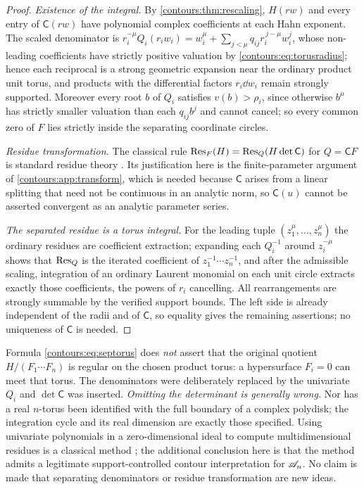 \documentclass[11pt,letterpaper]{article}
\theoremstyle{definition}
\theoremstyle{remark}
\numberwithin{equation}{section}
\begin{document}
\begin{proof}
\emph{Existence of the integral.} By \cref{contours:thm:rescaling}, $H(rw)$ and every
entry of $\mathsf C(rw)$ have polynomial complex coefficients at each Hahn exponent.
The scaled denominator is
$r_i^{-\mu}Q_i(r_iw_i)=w_i^\mu+\sum_{j<\mu}q_{ij}r_i^{\,j-\mu}w_i^j$, whose
non-leading coefficients have strictly positive valuation by
\eqref{contours:eq:torusradius}; hence each reciprocal is a strong geometric
expansion near the ordinary product unit torus, and products with the differential
factors $r_i\dd w_i$ remain strongly supported. Moreover every root $b$ of $Q_i$
satisfies $v(b)>\rho_i$, since otherwise $b^\mu$ has strictly smaller valuation than
each $q_{ij}b^j$ and cannot cancel; so every common zero of $F$ lies strictly inside
the separating coordinate circles.

\emph{Residue transformation.} The classical rule
$\operatorname{Res}_F(H)=\operatorname{Res}_Q(H\det\mathsf C)$ for $Q=\mathsf CF$ is standard residue theory
\cite[\S0]{CDS}. Its justification here is the finite-parameter argument of
\cref{contours:app:transform}, which is needed because $\mathsf C$ arises from a
linear splitting that need not be continuous in an analytic norm, so
$\mathsf C(u)$ cannot be asserted convergent as an analytic parameter series.

\emph{The separated residue is a torus integral.} For the leading tuple
$(z_1^\mu,\ldots,z_n^\mu)$ the ordinary residues are coefficient extraction;
expanding each $Q_i^{-1}$ around $z_i^{-\mu}$ shows that $\operatorname{Res}_Q$ is the iterated
coefficient of $z_1^{-1}\cdots z_n^{-1}$, and after the admissible scaling,
integration of an ordinary Laurent monomial on each unit circle extracts exactly
those coefficients, the powers of $r_i$ cancelling. All rearrangements are strongly
summable by the verified support bounds. The left side is already independent of the
radii and of $\mathsf C$, so equality gives the remaining assertions; no uniqueness
of $\mathsf C$ is needed.
\end{proof}

\begin{remark}
\label{contours:rem:toruslimits}
Formula \eqref{contours:eq:septorus} does \emph{not} assert that the original
quotient $H/(F_1\cdots F_n)$ is regular on the chosen product torus: a hypersurface
$F_i=0$ can meet that torus. The denominators were deliberately replaced by the
univariate $Q_i$ and $\det\mathsf C$ was inserted. \emph{Omitting the determinant is
generally wrong.} Nor has a real $n$-torus been identified with the full boundary of
a complex polydisk; the integration cycle and its real dimension are exactly those
specified. Using univariate polynomials in a zero-dimensional ideal to compute
multidimensional residues is a classical method \cite[\S0]{CDS}; the additional
conclusion here is that the method admits a legitimate support-controlled contour
interpretation for $\mathscr A_n$. No claim is made that separating denominators or residue
transformation are new ideas.
\end{remark}
\end{document}
